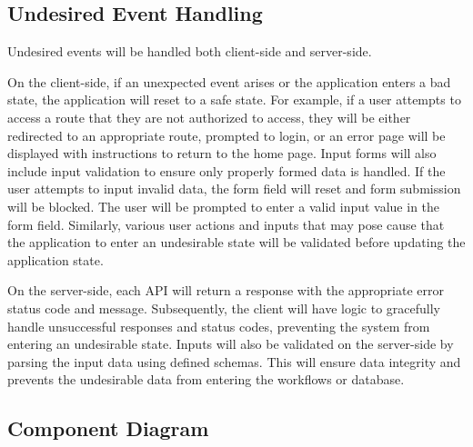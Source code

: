\documentclass[12pt, titlepage]{article}
\begin{document}
\subsection{Undesired Event Handling}

Undesired events will be handled both client-side and server-side.

On the client-side, if an unexpected event arises or the application enters a bad state, the
application will reset to a safe state. For example, if a user attempts to access a route that they
are not authorized to access, they will be either redirected to an appropriate route, prompted to
login, or an error page will be displayed with instructions to return to the home page. Input forms
will also include input validation to ensure only properly formed data is handled. If the user
attempts to input invalid data, the form field will reset and form submission will be blocked. The
user will be prompted to enter a valid input value in the form field. Similarly, various user
actions and inputs that may pose cause that the application to enter an undesirable state will be
validated before updating the application state.

On the server-side, each API will return a response with the appropriate error status code and
message. Subsequently, the client will have logic to gracefully handle unsuccessful responses and
status codes, preventing the system from entering an undesirable state. Inputs will also be
validated on the server-side by parsing the input data using defined schemas. This will ensure data
integrity and prevents the undesirable data from entering the workflows or database.

\subsection{Component Diagram}
\end{document}
